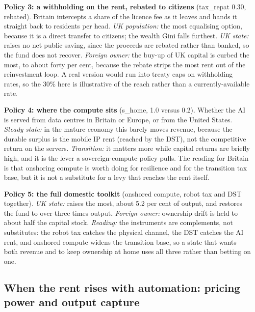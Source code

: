 \documentclass[12pt]{article}
\begin{document}
\textbf{Policy 3: a withholding on the rent, rebated to citizens}
(tax\_repat 0.30, rebated). Britain intercepts a share of the licence
fee as it leaves and hands it straight back to residents per head.
\emph{UK population:} the most equalising option, because it is a direct
transfer to citizens; the wealth Gini falls furthest. \emph{UK state:}
raises no net public saving, since the proceeds are rebated rather than
banked, so the fund does not recover. \emph{Foreign owner:} the buy-up
of UK capital is curbed the most, to about forty per cent, because the
rebate strips the most rent out of the reinvestment loop. A real version
would run into treaty caps on withholding rates, so the 30\% here is
illustrative of the reach rather than a currently-available rate.

\textbf{Policy 4: where the compute sits} (s\_home, 1.0 versus 0.2).
Whether the AI is served from data centres in Britain or Europe, or from
the United States. \emph{Steady state:} in the mature economy this
barely moves revenue, because the durable surplus is the mobile IP rent
(reached by the DST), not the competitive return on the servers.
\emph{Transition:} it matters more while capital returns are briefly
high, and it is the lever a sovereign-compute policy pulls. The reading
for Britain is that onshoring compute is worth doing for resilience and
for the transition tax base, but it is not a substitute for a levy that
reaches the rent itself.

\textbf{Policy 5: the full domestic toolkit} (onshored compute, robot
tax and DST together). \emph{UK state:} raises the most, about 5.2 per
cent of output, and restores the fund to over three times output.
\emph{Foreign owner:} ownership drift is held to about half the capital
stock. \emph{Reading:} the instruments are complements, not substitutes:
the robot tax catches the physical channel, the DST catches the AI rent,
and onshored compute widens the transition base, so a state that wants
both revenue and to keep ownership at home uses all three rather than
betting on one.

\hypertarget{when-the-rent-rises-with-automation-pricing-power-and-output-capture}{%
\subsection{When the rent rises with automation: pricing power and
output
capture}\label{when-the-rent-rises-with-automation-pricing-power-and-output-capture}}
\end{document}
